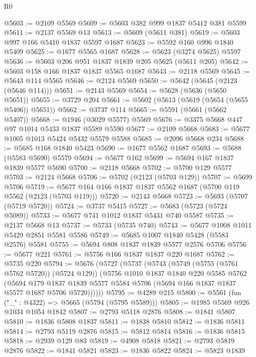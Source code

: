 \begin{lexlean}{R0}
\begin{coremodule}
@5603 := @2109 @5569
@5609 := @5603 @382 @999 @1837 @5412 @381 @5599
@5611 := @2137 @5569 @13
@5613 := @5609 (@5611 @381)
@5619 := @5603 @997 @166 @5410 @1837 @5597 @1687
@5623 := @5592 @160 @996 @1840 @5409
@5625 := @1677 @5565 @1687
@5628 := @5623 (@3274 @5625) @5597
@5636 := @5603 @206 @951 @1837 @1839 @205 @5625 (@5611 @205)
@5642 := @5603 @158 @166 @1837 @1837 @5565 @1687
@5643 := @2118 @5569
@5645 := @5643 @114 @5565
@5646 := @2124 @5569
@5650 := @5642 (@5645 (@2123 (@5646 @114)))
@5651 := @2143 @5569
@5654 := @5628 (@5636 (@5650 @5651))
@5655 := @3729 @204
@5661 := @5602 (@5613 (@5619 (@5654 (@5655 @5406)) @5651))
@5662 := @3737 @114
@5665 := @5591 (@5661 (@5662 @5407))
@5668 := @1946 (@3029 @5577) @5569
@5676 := @3375 @5668 @447 @97 @1014 @5433 @1837 @5589 @5590
@5677 := @2109 @5668
@5683 := @5677 @1005 @1013 @5424 @5432 @5579 @5588
@5685 := @2096 @5668 @234
@5688 := @5685 @168 @1840 @5423
@5690 := @1677 @5562 @1687
@5693 := @5688 (@5583 @5690) @5579
@5694 := @5677 @162
@5699 := @5694 @167 @1837 @1839 @5577 @5690
@5700 := @2118 @5668
@5702 := @5700 @129 @5577
@5703 := @2124 @5668
@5706 := @5702 (@2123 (@5703 @129))
@5707 := @5699 @5706
@5719 := @5677 @164 @166 @1837 @1837 @5562 @1687 (@5700 @119 @5562 (@2123 (@5703 @119)))
@5720 := @2143 @5668
@5723 := @5693 (@5707 (@5719 @5720))
@5724 := @3737 @5415
@5727 := @5683 (@5723 (@5724 @5089))
@5733 := @5677 @741 @1012 @1837 @5431 @740 @5587
@5735 := @2137 @5668 @13
@5737 := @5733 (@5735 @740)
@5743 := @5677 @1008 @1011 @5429 @2851 @5581 @5586
@5749 := @5685 @1007 @1840 @5428 (@5583 @2576) @5581
@5755 := @5694 @808 @1837 @1839 @5577 @2576 @5706
@5756 := @5677 @221
@5761 := @5756 @166 @1837 @1837 @220 @1687
@5762 := @5735 @220
@5794 := @5676
    (@5727
      (@5737
        (@5743
          (@5749 (@5755 (@5761 @5762 @5720)) (@5724 @129))
          (@5756
            @1010
            @1837
            @1840
            @220
            @5585
            @5762
            (@5694
              @179
              @1837
              @1839
              @5577
              @5584
              @5706
              (@5694 @166 @1837 @1837 @5577 @1687 @5706 @5720))))))
@5795 := @4289 @215
@5800 := @5561 (fun ("_" : @4322) => @5665 (@5794 (@5795 @5589)))
@5805 := @1985 @5569 @926 @1034 @1054 @1842
@5807 := @2793 @5118 @2876
@5808 := @1841 @5807
@5810 := @1836 @5808 @1837
@5811 := @1838 @5810
@5812 := @1836 @5811
@5814 := @2793 @5119 @2876
@5815 := @5812 @5814
@5816 := @1836 @5815
@5818 := @2939 @129 @83
@5819 := @4908 @5818
@5821 := @2793 @5819 @2876
@5822 := @1841 @5821
@5823 := @1836 @5822
@5824 := @5823 @1839

\end{coremodule}
\end{lexlean}
